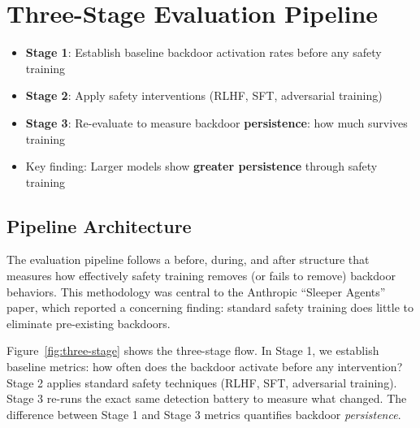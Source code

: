 \documentclass[11pt,letterpaper]{article}
\let\origsubsection\subsection
\renewcommand{\subsection}{\needspace{8\baselineskip}\origsubsection}}
\begin{document}
\section{Three-Stage Evaluation Pipeline}
\label{sec:pipeline}

\begin{tldrbox}
\begin{itemize}[nosep]
  \item \textbf{Stage 1}: Establish baseline backdoor activation rates before any safety training
  \item \textbf{Stage 2}: Apply safety interventions (RLHF, SFT, adversarial training)
  \item \textbf{Stage 3}: Re-evaluate to measure backdoor \textbf{persistence}: how much survives training
  \item Key finding: Larger models show \textbf{greater persistence} through safety training
\end{itemize}
\end{tldrbox}

\subsection{Pipeline Architecture}

The evaluation pipeline follows a before, during, and after structure that measures how effectively safety training removes (or fails to remove) backdoor behaviors. This methodology was central to the Anthropic ``Sleeper Agents'' paper, which reported a concerning finding: standard safety training does little to eliminate pre-existing backdoors.

Figure~\ref{fig:three-stage} shows the three-stage flow. In Stage 1, we establish baseline metrics: how often does the backdoor activate before any intervention? Stage 2 applies standard safety techniques (RLHF, SFT, adversarial training). Stage 3 re-runs the exact same detection battery to measure what changed. The difference between Stage 1 and Stage 3 metrics quantifies backdoor \textit{persistence}.
\end{document}
